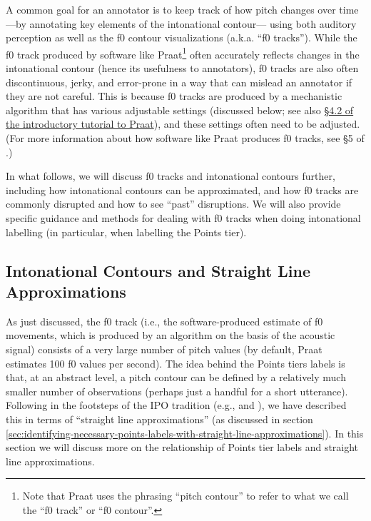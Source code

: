 A common goal for an annotator is to keep track of how pitch changes over time —by annotating key elements of the intonational contour— using both auditory perception as well as the f0 contour visualizations (a.k.a. “f0 tracks”). While the f0 track produced by software like Praat\footnote{Note that Praat uses the phrasing “pitch contour” to refer to what we call the “f0 track” or “f0 contour”.} often accurately reflects changes in the intonational contour (hence its usefulness to annotators), f0 tracks are also often discontinuous, jerky, and error-prone in a way that can mislead an annotator if they are not careful. This is because f0 tracks are produced by a mechanistic algorithm that has various adjustable settings (discussed below; see also \href{https://www.fon.hum.uva.nl/praat/manual/Intro_4_2__Configuring_the_pitch_contour.html}{§4.2 of the introductory tutorial to Praat}), and these settings often need to be adjusted. (For more information about how software like Praat produces f0 tracks, see §5 of \citealt{weenink20}.)

In what follows, we will discuss f0 tracks and intonational contours further, including how intonational contours can be approximated, and how f0 tracks are commonly disrupted and how to see “past” disruptions. We will also provide specific guidance and methods for dealing with f0 tracks when doing intonational labelling (in particular, when labelling the Points tier).


\subsection{Intonational Contours and Straight Line Approximations}\label{sec:intonational-contours-and-straight-line-approximations}

As just discussed, the f0 track (i.e., the software-produced estimate of f0 movements, which is produced by an algorithm on the basis of the acoustic signal) consists of a very large number of pitch values (by default, Praat estimates 100 f0 values per second). The idea behind the Points tiers labels is that, at an abstract level, a pitch contour can be defined by a relatively much smaller number of observations (perhaps just a handful for a short utterance). Following in the footsteps of the IPO tradition (e.g., \citealt{t-hartcollier75} and \citealt{t-hart-90}), we have described this in terms of “straight line approximations” (as discussed in section \ref{sec:identifying-necessary-points-labels-with-straight-line-approximations}). In this section we will discuss more on the relationship of Points tier labels and straight line approximations.

